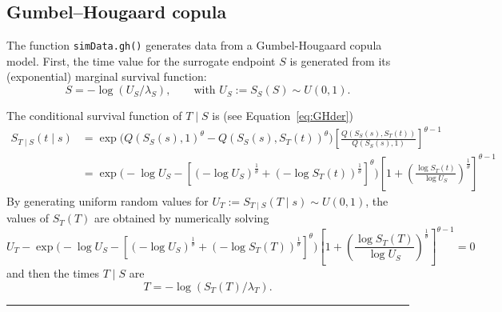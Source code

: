 \documentclass{article}
\begin{document}
  
\subsection*{Gumbel--Hougaard copula}
The function \texttt{simData.gh()} generates data from a Gumbel-Hougaard copula model.
First, the time value for the surrogate endpoint $S$ is generated
  from its (exponential) marginal survival function:
  \begin{equation}
    S = -\log(U_S / \lambda_S), \qquad\text{with }
      U_S := S_S(S) \sim U(0,1).
  \end{equation}

The conditional survival function of $T\mid S$ is
    (see Equation~\ref{eq:GHder})
  \begin{align}
    \nonumber
    S_{T\mid S}(t\mid s) 
    &= \exp\Big(
            Q(S_S(s), 1)^\theta - Q(S_S(s), S_T(t))^\theta
        \Big)\left[\frac{Q(S_S(s), S_T(t))}{Q(S_S(s), 1)}
            \right]^{\theta - 1}
    \\
    &= \exp\Big(
            -\log U_S - \left[
                (-\log U_S)^{\frac1\theta} + (-\log S_T(t))^{\frac1\theta}
            \right]^\theta
        \Big)
        \left[1 + \left(\frac{\log S_T(t)}{\log U_S}\right)^{\frac1\theta}
        \right]^{\theta-1}
  \end{align}
By generating uniform random values for 
  $U_T := S_{T\mid S}(T\mid s)\sim U(0,1)$,
  the values of $S_T(T)$ are obtained by numerically solving
  \begin{equation}
    U_T - \exp\Big(
            -\log U_S - \left[
                (-\log U_S)^{\frac1\theta} + (-\log S_T(T))^{\frac1\theta}
            \right]^\theta
        \Big)
        \left[1 + \left(\frac{\log S_T(T)}{\log U_S}\right)^{\frac1\theta}
        \right]^{\theta-1} = 0
  \end{equation}
  and then the times $T\mid S$ are
  \begin{equation}
    T = -\log(S_T(T) / \lambda_T).
  \end{equation}


\hrule
\nocite{Nelsen06, RotoloPoissurogate}


{}
\end{document}
